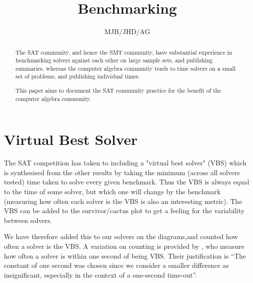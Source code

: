 \documentclass{article}
\begin{document}
\title{Benchmarking}
\author{MJB/JHD/AG}
\maketitle
\begin{abstract}\noindent
The SAT community, and hence the SMT community, have substantial experience in benchmarking solvers against each other on large sample sets, and publishing summaries, whereas the computer algebra community tends to time solvers on a small set of problems, and publishing individual times.
\par
This paper aims to document the SAT community practice for the benefit of the computer algebra community.
\end{abstract}

\section{Virtual Best Solver}
The SAT competition has taken to including a "virtual best solver" (VBS)
which is synthesised from the other results by taking the minimum (across all solvers tested) time taken to solve every given benchmark.
Thus the VBS is always equal to the time of some solver, but which one will change by the benchmark (measuring how often each solver is the VBS is also an interesting metric).  The VBS can be added to the survivor/cactus plot to get a feeling for the variability between solvers.
\par
We have therefore added this to our solvers on the diagrams,and counted how often a solver is the VBS. A variation on counting is provided by \cite{Janotaetal2016a}, who measure how often a solver is within one second of being VBS. Their justification is ``The constant of one second was chosen since we consider a smaller difference as insignificant, especially in the context of a one-second time-out''.
\end{document}
